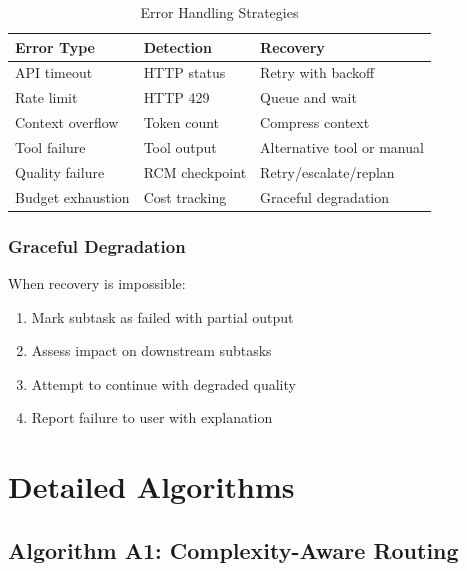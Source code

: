\documentclass{article}
\theoremstyle{plain}
\theoremstyle{definition}
\theoremstyle{remark}
\begin{document}
\begin{table}[H]
	\centering
	\caption{Error Handling Strategies}
	\small
	\begin{tabular}{@{}lll@{}}
		\toprule
		\textbf{Error Type} & \textbf{Detection} & \textbf{Recovery} \\
		\midrule
		API timeout & HTTP status & Retry with backoff \\
		Rate limit & HTTP 429 & Queue and wait \\
		Context overflow & Token count & Compress context \\
		Tool failure & Tool output & Alternative tool or manual \\
		Quality failure & RCM checkpoint & Retry/escalate/replan \\
		Budget exhaustion & Cost tracking & Graceful degradation \\
		\bottomrule
	\end{tabular}
\end{table}

\subsubsection{Graceful Degradation}

When recovery is impossible:
\begin{enumerate}
	\item Mark subtask as failed with partial output
	\item Assess impact on downstream subtasks
	\item Attempt to continue with degraded quality
	\item Report failure to user with explanation
\end{enumerate}

\section{Detailed Algorithms}
\label{app:algorithms}

\subsection{Algorithm A1: Complexity-Aware Routing}
\end{document}
